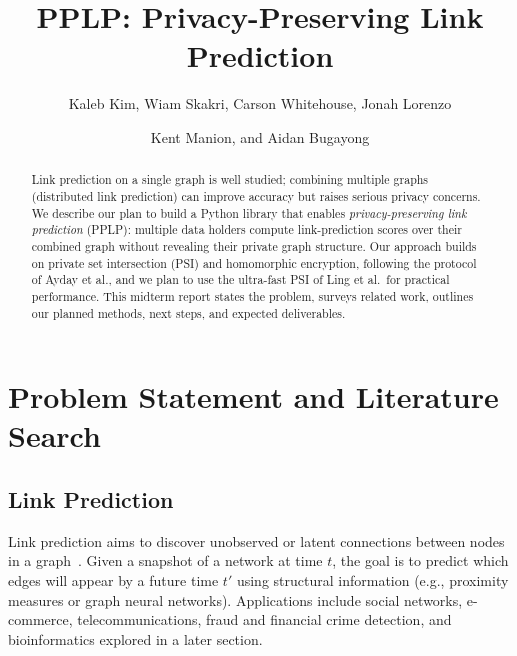 \documentclass[sigconf]{acmart}
\begin{document}
\title{PPLP: Privacy-Preserving Link Prediction}

\author{Kaleb Kim, Wiam Skakri, Carson Whitehouse, Jonah Lorenzo}
\author{Kent Manion, and Aidan Bugayong}
\renewcommand{\shortauthors}{Kim et al.}

\begin{abstract}
Link prediction on a single graph is well studied; combining multiple graphs (distributed link prediction) can improve accuracy but raises serious privacy concerns. We describe our plan to build a Python library that enables \emph{privacy-preserving link prediction} (PPLP): multiple data holders compute link-prediction scores over their combined graph without revealing their private graph structure. Our approach builds on private set intersection (PSI) and homomorphic encryption, following the protocol of Ayday et al., and we plan to use the ultra-fast PSI of Ling et al.\ for practical performance. This midterm report states the problem, surveys related work, outlines our planned methods, next steps, and expected deliverables.
\end{abstract}


\maketitle

\section{Problem Statement and Literature Search}

\subsection{Link Prediction}
Link prediction aims to discover unobserved or latent connections between nodes in a graph~\cite{liben-nowell2007link}. Given a snapshot of a network at time $t$, the goal is to predict which edges will appear by a future time $t'$ using structural information (e.g., proximity measures or graph neural networks). Applications include social networks, e-commerce, telecommunications, fraud and financial crime detection, and bioinformatics explored in a later section.
\end{document}
